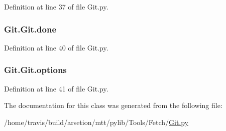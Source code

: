 Definition at line 37 of file Git.\-py.

\hypertarget{classGit_1_1Git_adb8991008d4bb4568fa9c2f991711cda}{
\subsubsection[{done}]{\setlength{\rightskip}{0pt plus 5cm}Git.\-Git.\-done}}\label{classGit_1_1Git_adb8991008d4bb4568fa9c2f991711cda}


Definition at line 40 of file Git.\-py.

\hypertarget{classGit_1_1Git_a7560b88b014c5da8785739c7bb6283ed}{
\subsubsection[{options}]{\setlength{\rightskip}{0pt plus 5cm}Git.\-Git.\-options}}\label{classGit_1_1Git_a7560b88b014c5da8785739c7bb6283ed}


Definition at line 41 of file Git.\-py.



The documentation for this class was generated from the following file\-:\begin{DoxyCompactItemize}
\item 
/home/travis/build/arsetion/mtt/pylib/\-Tools/\-Fetch/\hyperlink{Git_8py}{Git.\-py}\end{DoxyCompactItemize}
